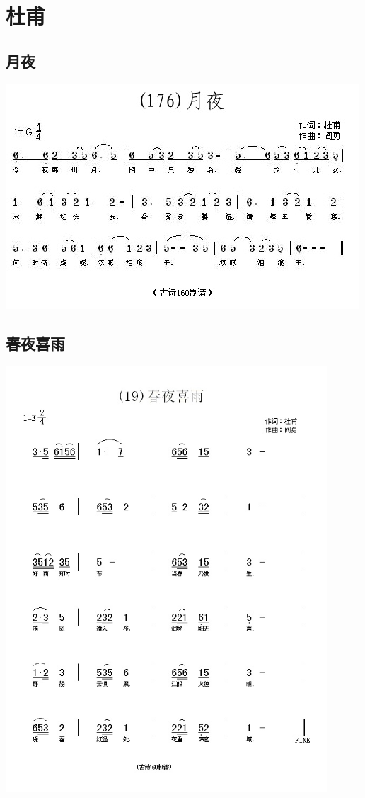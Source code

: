 \documentclass[cn,pad,chinesefont=nofont,twocol]{elegantbook}
\begin{document}
\chapter{杜甫}
\section{月夜}
    \includegraphics[width=\textwidth]{dongxiao/20200808-月夜-杜甫.jpg}  
\section{春夜喜雨}
    \includegraphics[width=0.9\textwidth]{dongxiao/20200808-春夜喜雨-杜甫.jpg}
                   
\end{document}
